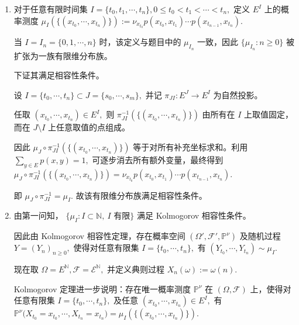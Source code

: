 \documentclass{ctexart}
\begin{document}
\begin{solution}
  \begin{enumerate}
    \item 对于任意有限时间集
      \( I = \{t_0,t_1,\cdots,t_n\}, 0 \leq t_0 < t_1 < \cdots < t_n, \)
      定义 \(E^I\) 上的概率测度
      \( \mu_I(\{(x_{t_0},\cdots,x_{t_n})\}) := \nu_{x_{t_0}} p(x_{t_0},x_{t_1}) \cdots p(x_{t_{n-1}},x_{t_n}). \)

      当 \(I = I_n = \{0,1,\cdots,n\}\) 时，该定义与题目中的 \(\mu_{I_n}\) 一致，因此
      \( \{\mu_{I_n} : n \geq 0\} \)
      被扩张为一族有限维分布族。

      下证其满足相容性条件。

      设
      \( I = \{t_0,\cdots,t_n\} \subset J = \{s_0,\cdots,s_m\}, \)
      并记
      \( \pi_{JI} : E^J \to E^I \)
      为自然投影。

      任取
      \( (x_{t_0},\cdots,x_{t_n}) \in E^I, \)
      则
      \( \pi_{JI}^{-1}(\{(x_{t_0},\cdots,x_{t_n})\}) \)
      由所有在 \(I\) 上取值固定，而在 \(J \setminus I\) 上任意取值的点组成。

      因此
      \( \mu_J \circ \pi_{JI}^{-1}(\{(x_{t_0},\cdots,x_{t_n})\}) \)
      等于对所有补充坐标求和。利用
      \( \sum_{y \in E} p(x,y) = 1, \)
      可逐步消去所有额外变量，最终得到
      \( \mu_J \circ \pi_{JI}^{-1}(\{(x_{t_0},\cdots,x_{t_n})\}) = \nu_{x_{t_0}} p(x_{t_0},x_{t_1}) \cdots p(x_{t_{n-1}},x_{t_n}). \)

      即
      \( \mu_J \circ \pi_{JI}^{-1} = \mu_I. \)
      故该有限维分布族满足相容性条件。

    \item 由第一问知，
      \( \{\mu_I : I \subset \mathbb{N},\ I \text{ 有限}\} \)
      满足 Kolmogorov 相容性条件。

      因此由 Kolmogorov 相容性定理，存在概率空间
      \( (\Omega',\mathcal{F}',\mathbb{P}^{\nu}) \)
      及随机过程
      \( Y = (Y_n)_{n \geq 0}, \)
      使得对任意有限集
      \( I = \{t_0,\cdots,t_n\}, \)
      有
      \( (Y_{t_0},\cdots,Y_{t_n}) \sim \mu_I. \)

      现在取
      \( \Omega = E^{\mathbb{N}}, \mathcal{F} = \mathcal{E}^{\mathbb{N}}, \)
      并定义典则过程
      \( X_n(\omega) := \omega(n). \)

      Kolmogorov 定理进一步说明：存在唯一概率测度
      \( \mathbb{P}^{\nu} \)
      在 \((\Omega,\mathcal{F})\) 上，使得对任意有限集
      \( I = \{t_0,\cdots,t_n\}, \)
      及任意
      \( (x_{t_0},\cdots,x_{t_n}) \in E^I, \)
      有
      \( \mathbb{P}^{\nu} \bigl( X_{t_0}=x_{t_0}, \cdots, X_{t_n}=x_{t_n} \bigr) = \mu_I(\{(x_{t_0},\cdots,x_{t_n})\}). \)


\end{enumerate}
\end{solution}
\end{document}
